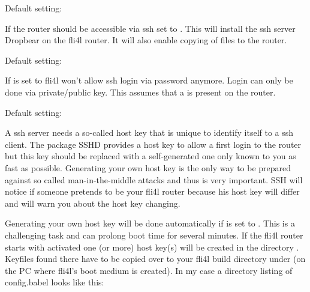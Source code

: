 \begin{description}


  Default setting: 

  If the router should be accessible via ssh set  to . 
  This will install the ssh server Dropbear on the fli4l router. It will also 
  enable copying of files to the router.
  

  Default setting: 

  If  is set to  fli4l won't allow 
  ssh login via password anymore. Login can only be done via private/public key.
  This assumes that a  is present 
  on the router.


  Default setting: 

  A ssh server needs a so-called host key that is unique to identify itself 
  to a ssh client. The package SSHD provides a host key to allow a first 
  login to the router but this key should be replaced with a self-generated 
  one only known to you as fast as possible. Generating your own host key is 
  the only way to be prepared against so called man-in-the-middle attacks 
  and thus is very important. SSH will notice if someone pretends to be your 
  fli4l router because his host key will differ and will warn you about the 
  host key changing.
  
  Generating your own host key will be done automatically if 
   is set to . This is a challenging  
  task and can prolong boot time for several minutes. If the fli4l router 
  starts with  activated one (or more) host key(s) 
  will be created in the directory . Keyfiles found there 
  have to be copied over to your fli4l build directory under  
  (on the PC where fli4l's boot medium is created). In my case a directory 
  listing of config.babel looks like this:


\end{description}
